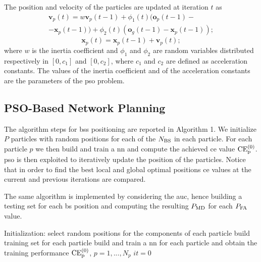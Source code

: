 \documentclass[twocolumns]{IEEEtran}
\begin{document}
The position and velocity of the particles are updated at iteration $t$ as
  \begin{equation}\label{eq: v up}
\begin{split}
  \bm{v}_p(t) = w\bm{v}_p(t-1)+\phi_1(t)(\bm{o}_p(t-1)-\\
  -\bm{x}_p(t-1))+\phi_2(t)(\bm{o}_g(t-1)-\bm{x}_p(t-1));
  \end{split}
  \end{equation}
  \begin{equation}\label{eq: p up}
  \bm{x}_p(t) = \bm{x}_p(t-1) + \bm{v}_p(t);
 \end{equation}
where $w$ is the inertia coefficient and $\phi_1$ and $\phi_2$ are random variables distributed respectively in $[0,c_1]$ and $[0,c_2]$, where $c_1$ and $c_2$ are defined as acceleration constants. The values of the inertia coefficient and of the acceleration constants are the parameters of the \ac{pso} problem.

\subsection{PSO-Based Network Planning}

The algorithm steps for \acp{bs} positioning are reported in Algorithm 1. We initialize $P$ particles with random positions for each of the $N_{\rm BS}$ in each particle. For each particle $p$ we then build and train a \ac{nn} and compute the achieved \ac{ce} value $\rm{CE}_p^{(0)}$. \ac{pso} is then exploited to iteratively update the position of the particles. Notice that in order to find the best local and global optimal positions \ac{ce} values at the current and previous iterations are compared. 

The same algorithm is implemented by considering the \ac{auc}, hence building a testing set for each \ac{bs} position and computing the resulting $P_{\rm MD}$ for each $P_{\rm FA}$ value.

 \begin{algorithm}[t]
   \scriptsize

  Initialization: select random positions for the components of each particle\;
                  build training set for each particle\;
                  build and train a \ac{nn} for each particle and obtain the training performance $\rm{CE}_p^{(0)}$, $p=1,...,N_p$\;
                  $it = 0$\;

    
\caption{BSs positioning algorithm}
 \end{algorithm}
\end{document}
